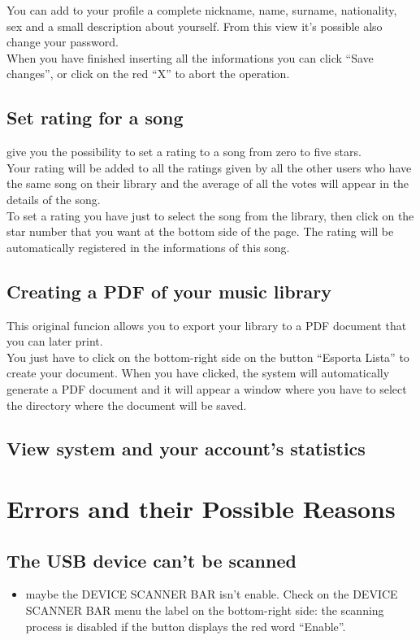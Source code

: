 You can add to your profile a complete nickname, name, surname, nationality, sex
and a small description about yourself. From this view it's possible also change
your password.\\
When you have finished inserting all the informations you can click ``Save
changes'', or click on the red ``X'' to abort the operation.

\subsection*{Set rating for a song}

 give you the possibility to set a rating to a song from zero to five
stars.\\
Your rating will be added to all the ratings given by all the other users who
have the same song on their library and the average of all the votes will appear
in the details of the song.\\
To set a rating you have just to select the song from the library, then click on
the star number that you want at the bottom side of the page. The rating will be
automatically registered in the informations of this song.

\subsection*{Creating a PDF of your music library}

This original funcion allows you to export your library to a PDF document that
you can later print.\\
You just have to click on the bottom-right side on the button ``Esporta Lista''
to create your document. When you have clicked, the system will automatically
generate a PDF document and it will appear a window where you have to select the
directory where the document will be saved.

\subsection*{View system and your account's statistics}


\newpage
\section{Errors and their Possible Reasons}

\subsection*{The USB device can't be scanned}
\begin{itemize}
  \item maybe the DEVICE SCANNER BAR isn't enable. Check on the DEVICE SCANNER
  BAR menu the label on the bottom-right side: the scanning process is disabled
  if the button displays the red word ``Enable''.
\end{itemize}

